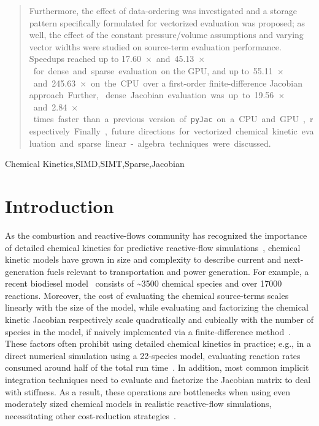 \documentclass[12pt,number,sort&compress,preprint]{elsarticle}
\newcommand{\revise}[1]{{\sloppy\textcolor{RoyalPurple}{#1}}}  %
\begin{document}
\begin{frontmatter}
\begin{abstract}
Furthermore, the effect of data-ordering was investigated and \revise{a} storage pattern specifically formulated for vectorized evaluation was proposed; as well, the effect of the \revise{constant pressure\slash volume} assumptions and varying vector widths were studied on source-term evaluation performance.
Speedups \revise{reached up to} \SI{17.60}{$\times$} and \SI{45.13}{$\times$} for dense and sparse evaluation \revise{on the GPU, and up to} \SI{55.11}{$\times$} and \SI{245.63}{$\times$} on the CPU \revise{over a first-order finite-difference  Jacobian approach}.
\revise{Further, }dense Jacobian evaluation was up to \SI{19.56}{$\times$} and \SI{2.84}{$\times$} times faster than a previous version of \texttt{pyJac} on a CPU and GPU, respectively.
Finally, future directions for vectorized chemical kinetic evaluation and sparse linear-algebra techniques were discussed.
\end{abstract}

\begin{keyword}
    Chemical Kinetics\sep SIMD\sep SIMT\sep Sparse\sep Jacobian
\end{keyword}

\end{frontmatter}

\section{Introduction}
%

\revise{As the combustion and reactive-flows community has recognized the importance of detailed chemical kinetics for predictive reactive-flow simulations~\cite{LU2009192}, chemical kinetic models have grown in size and complexity to describe current and next-generation fuels relevant to transportation and power generation.}
\revise{For example,} a recent biodiesel model~\cite{WESTBROOK2011742} consists of \textasciitilde\num{3500} chemical species and over \num{17000} reactions.
Moreover, the cost of evaluating the chemical source-terms scales linearly with the size of the model, while evaluating and factorizing the chemical kinetic Jacobian respectively scale quadratically and cubically with the number of species in the model, \revise{if naively implemented via a finite-difference method~\cite{LU2009192}}.
These factors often \revise{prohibit using} detailed chemical kinetics in practice; e.g., in a direct numerical simulation \revise{using} a 22-species model, \revise{evaluating} reaction rates consumed around half of the total run time~\cite{Spafford:2010aa}.
\revise{In addition, most common implicit integration techniques need to evaluate and factorize the Jacobian matrix to deal with stiffness.
As a result, these operations are bottlenecks when using even moderately sized chemical models in realistic reactive-flow simulations, necessitating other cost-reduction strategies~\cite{LU2009192}.}
\end{document}
